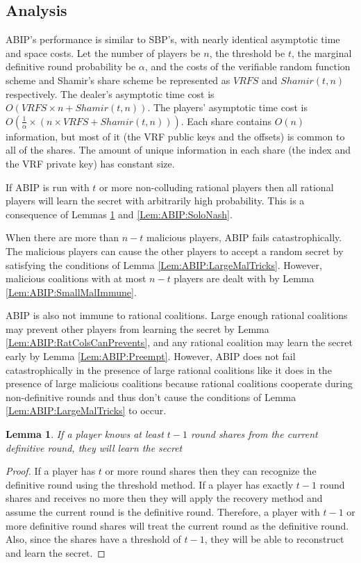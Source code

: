 \documentclass{dalcsthesis}
\newtheorem{lemma}{Lemma}
\begin{document}
\subsection{Analysis}

ABIP's performance is similar to SBP's, with nearly identical asymptotic time and space costs. Let the number of players be $n$, the threshold be $t$, the marginal definitive round probability be $\alpha$, and the costs of the verifiable random function scheme and Shamir's share scheme be represented as $VRFS$ and $Shamir(t, n)$ respectively. The dealer's asymptotic time cost is $O(VRFS \times n + Shamir(t, n))$. The players' asymptotic time cost is $O(\frac{1}{\alpha} \times (n \times VRFS + Shamir(t, n)))$. Each share contains $O(n)$ information, but most of it (the VRF public keys and the offsets) is common to all of the shares. The amount of unique information in each share (the index and the VRF private key) has constant size.

If ABIP is run with $t$ or more non-colluding rational players then all rational players will learn the secret with arbitrarily high probability. This is a consequence of Lemmas \ref{Lem:ABIP:t-1Def_Sufficient} and \ref{Lem:ABIP:SoloNash}.  

When there are more than $n-t$ malicious players, ABIP fails catastrophically. The malicious players can cause the other players to accept a random secret by satisfying the conditions of Lemma \ref{Lem:ABIP:LargeMalTricks}. However, malicious coalitions with at most $n-t$ players are dealt with by Lemma \ref{Lem:ABIP:SmallMalImmune}.

ABIP is also not immune to rational coalitions. Large enough rational coalitions may prevent other players from learning the secret by Lemma \ref{Lem:ABIP:RatColsCanPrevents}, and any rational coalition may learn the secret early by Lemma \ref{Lem:ABIP:Preempt}. However, ABIP does not fail catastrophically in the presence of large rational coalitions like it does in the presence of large malicious coalitions because rational coalitions cooperate during non-definitive rounds and thus don't cause the conditions of Lemma \ref{Lem:ABIP:LargeMalTricks} to occur. 

\begin{lemma} If a player knows at least $t-1$ round shares from the current definitive round, they will learn the secret \label{Lem:ABIP:t-1Def_Sufficient} \end{lemma}
\begin{proof}
If a player has $t$ or more round shares then they can recognize the definitive round using the threshold method. If a player has exactly $t-1$ round shares and receives no more then they will apply the recovery method and assume the current round is the definitive round. Therefore, a player with $t-1$ or more definitive round shares will treat the current round as the definitive round. Also, since the shares have a threshold of $t-1$, they will be able to reconstruct and learn the secret.
\end{proof}
\end{document}
